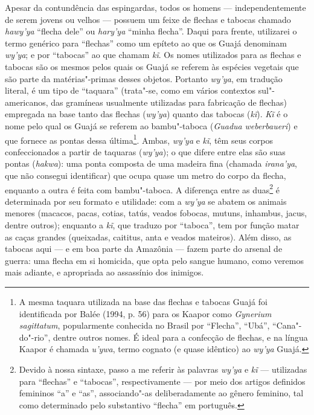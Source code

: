 Apesar da contundência das espingardas, todos os homens ---
independentemente de serem jovens ou velhos --- possuem um feixe de
flechas e tabocas chamado \emph{hawy'ya} ``flecha dele'' ou
\emph{hary'ya} ``minha flecha''. Daqui para frente, utilizarei o termo
genérico para ``flechas'' como um epíteto ao que os Guajá denominam
\emph{wy'ya}; e por ``tabocas'' ao que chamam \emph{kĩ}. Os nomes
utilizados para as flechas e tabocas são os mesmos pelos quais os Guajá
se referem às espécies vegetais que são parte da matérias"-primas desses
objetos. Portanto \emph{wy'ya}, em tradução literal, é um tipo de
``taquara'' (trata"-se, como em vários contextos sul"-americanos, das
gramíneas usualmente utilizadas para fabricação de flechas) empregada na
base tanto das flechas (\emph{wy'ya}) quanto das tabocas (\emph{kĩ}).
\emph{Kĩ} é o nome pelo qual os Guajá se referem ao bambu"-taboca
(\emph{Guadua} \emph{weberbaueri}) e que fornece as pontas dessa
última\footnote{A mesma taquara utilizada na base das flechas e tabocas
  Guajá foi identificada por Balée (1994, p. 56) para os Kaapor como
  \emph{Gynerium} \emph{sagittatum}, popularmente conhecida no Brasil
  por ``Flecha'', ``Ubá'', ``Cana"-do"-rio'', dentre outros nomes. É ideal para
  a confecção de flechas, e na língua Kaapor é chamada \emph{u'ywa},
  termo cognato (e quase idêntico) ao \emph{wy'ya} Guajá.}. Ambas,
\emph{wy'ya} e \emph{kĩ}, têm seus corpos confeccionados a partir de
taquaras (\emph{wy'ya}); o que difere entre elas são suas pontas
(\emph{hakwa}): uma ponta composta de uma madeira fina (chamada
\emph{irana'ya}, que não consegui identificar) que ocupa quase um metro
do corpo da flecha, enquanto a outra é feita com bambu"-taboca. A
diferença entre as duas\footnote{Devido à nossa sintaxe, passo a me
  referir às palavras \emph{wy'ya} e \emph{kĩ} --- utilizadas para
  ``flechas'' e ``tabocas'', respectivamente --- por meio dos artigos
  definidos femininos ``a'' e ``as'', associando"-as deliberadamente ao
  gênero feminino, tal como determinado pelo substantivo ``flecha'' em
  português.} é determinada por seu formato e utilidade: com a
\emph{wy'ya} se abatem os animais menores (macacos, pacas, cotias,
tatús, veados fobocas, mutuns, inhambus, jacus, dentre outros); enquanto
a \emph{kĩ}, que traduzo por ``taboca'', tem por função matar as caças
grandes (queixadas, caititus, anta e veados mateiros). Além disso, as
tabocas aqui --- e em boa parte da Amazônia --- fazem parte do arsenal de
guerra: uma flecha em si homicida, que opta pelo sangue humano, como
veremos mais adiante, e apropriada ao assassínio dos inimigos.

